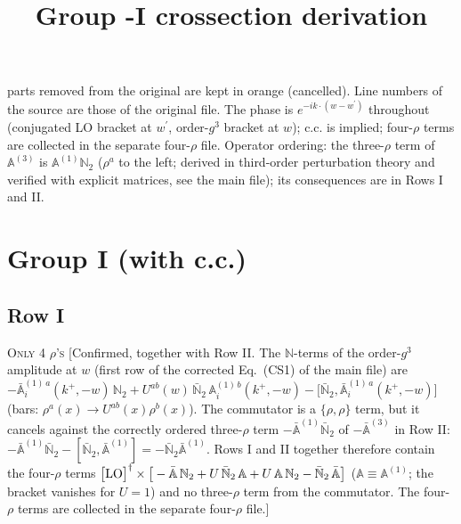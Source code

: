 \documentclass[9pt]{article}
\title{Group -I crossection derivation}
\author{}
\date{}
\def\mf#1{\mathbb{#1}}
\numberwithin{equation}{section}
\begin{document}
\maketitle {} {\color{orange}parts removed from the original are kept in orange (cancelled).} {\color{red}Line numbers of the source are those of the original file. The phase is $e^{-ik\cdot(w-w^{\prime})}$ throughout (conjugated LO bracket at $w^{\prime}$, order-$g^{3}$ bracket at $w$); c.c. is implied; four-$\rho$ terms are collected in the separate four-$\rho$ file. Operator ordering: the three-$\rho$ term of $\mf{A}^{(3)}$ is $\mf{A}^{(1)}\mf{N}_{2}$ ($\rho^{a}$ to the left; derived in third-order perturbation theory and verified with explicit matrices, see the main file); its consequences are in Rows I and II.}\par
\section{Group I (with c.c.)}
\subsection{Row I\,}
\textsc{Only 4 $\rho$'s} {\color{red}[Confirmed, together with Row II. The $\mf{N}$-terms of the order-$g^{3}$ amplitude at $w$ (first row of the corrected Eq.~(CS1) of the main file) are $-\bar{\mf{A}}^{(1)\,a}_{i}(k^{+},-w)\,\mf{N}_{2}+U^{ab}(w)\,\bar{\mf{N}}_{2}\,\mf{A}^{(1)\,b}_{i}(k^{+},-w)-\big[\bar{\mf{N}}_{2},\bar{\mf{A}}^{(1)\,a}_{i}(k^{+},-w)\big]$ (bars: $\rho^{a}(x)\to U^{ab}(x)\rho^{b}(x)$). The commutator is a $\{\rho,\rho\}$ term, but it cancels against the correctly ordered three-$\rho$ term $-\bar{\mf{A}}^{(1)}\bar{\mf{N}}_{2}$ of $-\bar{\mf{A}}^{(3)}$ in Row II: $-\bar{\mf{A}}^{(1)}\bar{\mf{N}}_{2}-[\bar{\mf{N}}_{2},\bar{\mf{A}}^{(1)}]=-\bar{\mf{N}}_{2}\bar{\mf{A}}^{(1)}$. Rows I and II together therefore contain the four-$\rho$ terms $\big[{\rm LO}\big]^{\dagger}\times\big[-\bar{\mf{A}}\,\mf{N}_{2}+U\,\bar{\mf{N}}_{2}\,\mf{A}+U\,\mf{A}\,\mf{N}_{2}-\bar{\mf{N}}_{2}\,\bar{\mf{A}}\big]$ ($\mf{A}\equiv\mf{A}^{(1)}$; the bracket vanishes for $U=1$) and no three-$\rho$ term from the commutator. The four-$\rho$ terms are collected in the separate four-$\rho$ file.]}
\end{document}
